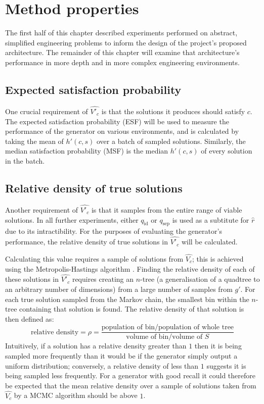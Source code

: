 \documentclass[../../main.tex]{subfiles}
\begin{document}
\section{Method properties} \label{section:methodProperties}

The first half of this chapter described experiments performed on abstract, simplified engineering problems to inform the design of the project's proposed architecture.
The remainder of this chapter will examine that architecture's performance in more depth and in more complex engineering environments.

\subsection{Expected satisfaction probability} \label{subsection:expectedSatisfactionProbability}

One crucial requirement of $\hat{V'_c}$ is that the solutions it produces should satisfy $c$.
The expected satisfaction probability (ESF) will be used to measure the performance of the generator on various environments, and is calculated by taking the mean of $h'(c,s)$ over a batch of sampled solutions.
Similarly, the median satisfaction probability (MSF) is the median $h'(c,s)$ of every solution in the batch.

\subsection{Relative density of true solutions} \label{subsection:relativeDensityOfTrueSolutions}

Another requirement of $\hat{V'_c}$ is that it samples from the entire range of viable solutions.
In all further experiments, either $q_\text{id}$ or $q_\text{sep}$ is used as a subtitute for $\hat{r}$ due to its intractibility.
For the purposes of evaluating the generator's performance, the relative density of true solutions in $\hat{V'_c}$ will be calculated.

Calculating this value requires a sample of solutions from $\hat{V_c}$; this is achieved using the Metropolis-Hastings algorithm \cite{robert16}.
Finding the relative density of each of these solutions in $\hat{V'_c}$ requires creating an $n$-tree (a generalisation of a quadtree to an arbitrary number of dimensions) from a large number of samples from $g'$.
For each true solution sampled from the Markov chain, the smallest bin within the $n$-tree containing that solution is found.
The relative density of that solution is then defined as:
\begin{equation}
    \text{relative density}=\rho=\frac{\text{population of bin}/\text{population of whole tree}}{\text{volume of bin}/\text{volume of }S}
\end{equation}
Intuitively, if a solution has a relative density greater than $1$ then it is being sampled more frequently than it would be if the generator simply output a uniform distribution; conversely, a relative density of less than $1$ suggests it is being sampled less frequently.
For a generator with good recall it could therefore be expected that the mean relative density over a sample of solutions taken from $\hat{V_c}$ by a MCMC algorithm should be above $1$.
\end{document}
